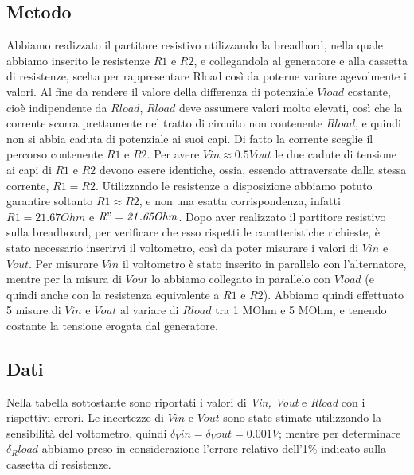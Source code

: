 \documentclass[a4paper]{article}
\begin{document}
\subsection{Metodo}
Abbiamo realizzato il partitore resistivo utilizzando la breadbord, nella quale abbiamo inserito le resistenze \( \mathit{R1} \) e \( \mathit{R2} \),
e collegandola al generatore e alla cassetta di resistenze, scelta per rappresentare Rload così da poterne variare agevolmente i valori.
Al fine da rendere il valore della differenza di potenziale \( \mathit{Vload} \) costante, cioè indipendente da \( \mathit{Rload} \),
\( \mathit{Rload} \) deve assumere valori molto elevati, così che la corrente scorra prettamente nel tratto di circuito non contenente \( \mathit{Rload} \), e quindi non si abbia caduta di potenziale ai suoi capi.
Di fatto la corrente sceglie il percorso contenente \( \mathit{R1} \) e \( \mathit{R2} \).
Per avere \( \mathit{Vin \approx 0.5Vout} \) le due cadute di tensione ai capi di \( \mathit{R1} \) e \( \mathit{R2} \) devono essere identiche, ossia, essendo attraversate dalla stessa corrente, \( \mathit{R1=R2} \).
Utilizzando le resistenze a disposizione abbiamo potuto garantire soltanto \(
\mathit{R1\approx R2} \), e non una esatta corrispondenza, infatti \( \mathit{R1=21.67 Ohm} \) e \( \mathit{R"=21.65 Ohm} \).
Dopo aver realizzato il partitore resistivo sulla breadboard, per verificare che esso rispetti le caratteristiche richieste, è stato necessario inserirvi il voltometro,
così da poter misurare i valori di \( \mathit{Vin} \) e \( \mathit{Vout} \). Per misurare \( \mathit{Vin} \) il voltometro è stato inserito in parallelo con l'alternatore,
mentre per la misura di \( \mathit{Vout} \) lo abbiamo collegato in parallelo con \( \mathit{Vload} \) (e quindi anche con la resistenza equivalente a \( \mathit{R1} \) e \( \mathit{R2} \)).
Abbiamo quindi effettuato 5 misure di \( \mathit{Vin} \) e \( \mathit{Vout} \) al variare di \( \mathit{Rload} \) tra 1 MOhm e 5 MOhm, e tenendo costante la tensione erogata dal generatore.
\subsection{Dati}
Nella tabella sottostante sono riportati i valori di \emph{Vin, Vout} e \emph{Rload} con i rispettivi errori.
Le incertezze di \( \mathit{Vin} \) e \( \mathit{Vout} \) sono state stimate utilizzando la sensibilità del voltometro, quindi \( \mathit{\delta_Vin=\delta_Vout=0.001 V} \);
mentre per determinare \( \mathit{\delta_Rload} \) abbiamo preso in considerazione l'errore relativo dell'1\% indicato sulla cassetta di resistenze.
\end{document}
